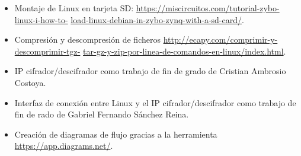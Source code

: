\begin{itemize}
	\item Montaje de Linux en tarjeta SD:  \url{https://miscircuitos.com/tutorial-zybo-linux-i-how-to-} \url{load-linux-debian-in-zybo-zynq-with-a-sd-card/}.
	
	\item Compresión y descompresión de ficheros \url{http://ecapy.com/comprimir-y-descomprimir-tgz-} \url{tar-gz-y-zip-por-linea-de-comandos-en-linux/index.html}.
	
	\item IP cifrador/descifrador como trabajo de fin de grado de Cristian Ambrosio Costoya.
	
	\item Interfaz de conexión entre Linux y el IP cifrador/descifrador como trabajo de fin de rado de Gabriel Fernando Sánchez Reina.
	
	\item Creación de diagramas de flujo gracias a la herramienta \url{https://app.diagrams.net/}.
\end{itemize}